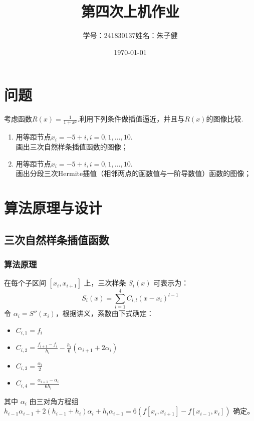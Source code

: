 \documentclass{article}
\title{第四次上机作业}
\author{学号：241830137\quad 姓名：朱子健}
\date{\today}
\begin{document}
\maketitle

\section{问题}
考虑函数\(R(x)=\frac{1}{1+x^2}\).利用下列条件做插值逼近，并且与\(R(x)\)的图像比较.
\begin{enumerate}[(1)]
    \item 用等距节点\(x_i = -5 + i, i = 0, 1,...,10\).\\
          画出三次自然样条插值函数的图像；
    \item 用等距节点\(x_i = -5 + i, i = 0, 1,...,10\).\\
          画出分段三次Hermite插值（相邻两点的函数值与一阶导数值）函数的图像；
\end{enumerate}
\section{算法原理与设计}
\subsection{三次自然样条插值函数}
\subsubsection{算法原理}
在每个子区间 $[x_i, x_{i+1}]$ 上，三次样条 $S_i(x)$ 可表示为：
\begin{equation}
S_i(x) = \sum_{l=1}^{4} C_{i,l}(x - x_i)^{l-1}
\end{equation}
令 $\alpha_i = S''(x_i)$，根据讲义，系数由下式确定：
\begin{itemize}
    \item $C_{i,1} = f_i$
    \item $C_{i,2} = \frac{f_{i+1} - f_i}{h_i} - \frac{h_i}{6}(\alpha_{i+1} + 2\alpha_i)$
    \item $C_{i,3} = \frac{\alpha_i}{2}$
    \item $C_{i,4} = \frac{\alpha_{i+1} - \alpha_i}{6h_i}$
\end{itemize}
其中 $\alpha_i$ 由三对角方程组 $h_{i-1}\alpha_{i-1} + 2(h_{i-1}+h_i)\alpha_i + h_i\alpha_{i+1} = 6(f[x_i, x_{i+1}] - f[x_{i-1}, x_i])$ 确定。
\end{document}
